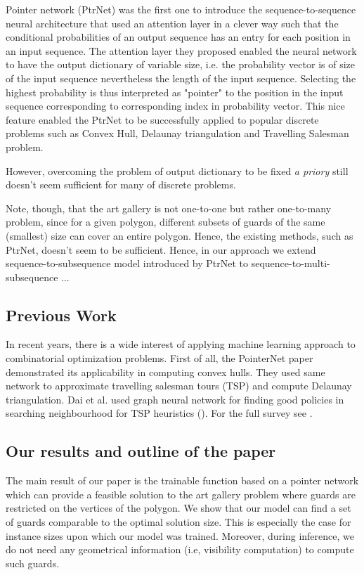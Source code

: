 \documentclass{article}
\begin{document}
Pointer network (PtrNet) \cite{paper/vinyals2017pointer} was the first one to introduce the sequence-to-sequence neural architecture that used an attention layer in a clever way such that the  conditional probabilities of an output sequence has an entry for each position in an input sequence. The attention layer they proposed enabled the neural network to have the output dictionary of variable size, i.e. the probability vector is of size of the input sequence nevertheless the length of the input sequence. Selecting the highest probability is thus interpreted as "pointer" to the position in the input sequence corresponding to corresponding index in probability vector. This nice feature enabled the PtrNet to be successfully applied to popular discrete problems such as Convex Hull, Delaunay triangulation and Travelling Salesman problem.


However, overcoming the problem of output dictionary to be fixed {\it a priory} still doesn't seem sufficient for many of discrete problems. 

Note, though, that the art gallery is not one-to-one but rather one-to-many problem, since for a given polygon, different subsets of guards of the same (smallest) size can cover an entire polygon. Hence, the existing methods, such as PtrNet, doesn't seem to be sufficient. Hence, in our approach we extend sequence-to-subsequence model introduced by PtrNet to sequence-to-multi-subsequence ... 

\subsection{Previous Work} \label{sec:prev-work} 


In recent years, there is a wide interest of applying machine learning approach to combinatorial optimization problems. First of all, the PointerNet paper demonstrated its applicability in computing convex hulls.  They used same network to approximate travelling salesman tours (TSP) and compute Delaunay triangulation.  Dai et al. used graph neural network for finding good policies in searching neighbourhood for TSP heuristics (\cite{}). For the full survey see \cite{tour }. 



\subsection{Our results and outline of the paper }
\label{sec:our-results}


The main result of our paper is the trainable function based on a pointer network which can provide a feasible solution to the art gallery problem where guards are restricted on the vertices of the polygon. We show that our model can find a set of guards comparable to the optimal solution size. This is especially the case for instance sizes upon which our model was trained. Moreover, during inference, we do not need any geometrical information (i.e, visibility computation) to compute such guards.  
\end{document}
